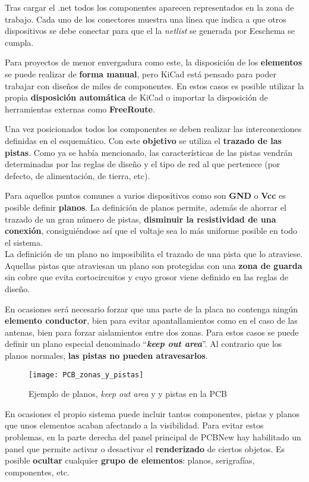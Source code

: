 Tras cargar el .net todos los componentes aparecen representados en la zona de trabajo. Cada uno de los conectores muestra una línea que indica a que otros dispositivos se debe conectar para que el la \textit{netlist} se generada por Eeschema se cumpla.

Para proyectos de menor envergadura como este, la disposición de los \textbf{elementos} se puede realizar de \textbf{forma manual}, pero KiCad está pensado para poder trabajar con diseños de miles de componentes. En estos casos es posible utilizar la propia \textbf{disposición automática} de KiCad o importar la disposición de herramientas externas como \textbf{FreeRoute}.

Una vez posicionados todos los componentes se deben realizar las interconexiones definidas en el esquemático. Con este \textbf{objetivo} se utiliza el \textbf{trazado de las pistas}. Como ya se había mencionado, las características de las pistas vendrán determinadas por las reglas de diseño y el tipo de red al que pertenece (por defecto, de alimentación, de tierra, etc).

Para aquellos puntos comunes a varios dispositivos como son \textbf{GND} o \textbf{Vcc} es posible definir \textbf{planos}. La definición de planos permite, además de ahorrar el trazado de un gran número de pistas, \textbf{disminuir la resistividad de una conexión}, consiguiéndose así que el voltaje sea lo más uniforme posible en todo el sistema.
\\La definición de un plano no imposibilita el trazado de una pista que lo atraviese. Aquellas pistas que atraviesan un plano son protegidas con una \textbf{zona de guarda} sin cobre que evita cortocircuitos y cuyo grosor viene definido en las reglas de diseño.

En ocasiones será necesario forzar que una parte de la placa no contenga ningún \textbf{elemento conductor}, bien para evitar apantallamientos como en el caso de las antenas, bien para forzar aislamientos entre dos zonas. Para estos casos se puede definir un plano especial denominado ``\textit{\textbf{keep out area}}''. Al contrario que los planos normales, \textbf{las pistas no pueden atravesarlos}.

\begin{figure} [H]
    \centering
    \texttt{[image: PCB\_zonas\_y\_pistas]}
    \caption{Ejemplo de planos, \textit{keep out area} y y pistas en la PCB}
    \label{fig:PCB_zonas_y_pistas}
\end{figure}

En ocasiones el propio sistema puede incluir tantos componentes, pistas y planos que unos elementos acaban afectando a la visibilidad. Para evitar estos problemas, en la parte derecha del panel principal de PCBNew hay habilitado un panel que permite activar o desactivar el \textbf{renderizado} de ciertos objetos. Es posible \textbf{ocultar} cualquier \textbf{grupo de elementos}: planos, serigrafías, componentes, etc.
 
